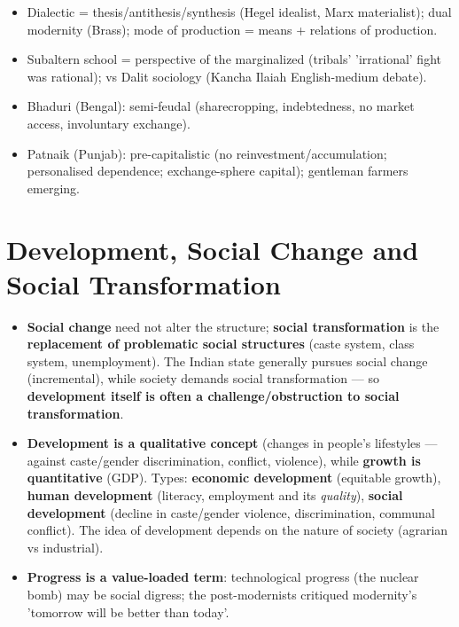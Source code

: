 \begin{QuickRevision}
\begin{itemize}
\item Dialectic = thesis/antithesis/synthesis (Hegel idealist, Marx materialist); dual modernity (Brass); mode of production = means + relations of production.
\item Subaltern school = perspective of the marginalized (tribals' 'irrational' fight was rational); vs Dalit sociology (Kancha Ilaiah English-medium debate).
\item Bhaduri (Bengal): semi-feudal (sharecropping, indebtedness, no market access, involuntary exchange).
\item Patnaik (Punjab): pre-capitalistic (no reinvestment/accumulation; personalised dependence; exchange-sphere capital); gentleman farmers emerging.
\end{itemize}
\end{QuickRevision}

\section{Development, Social Change and Social Transformation}

\begin{KeyConcept}
\begin{itemize}
\item \textbf{Social change} need not alter the structure; \textbf{social transformation} is the \textbf{replacement of problematic social structures} (caste system, class system, unemployment). The Indian state generally pursues social change (incremental), while society demands social transformation --- so \textbf{development itself is often a challenge/obstruction to social transformation}.
\item \textbf{Development is a qualitative concept} (changes in people's lifestyles --- against caste/gender discrimination, conflict, violence), while \textbf{growth is quantitative} (GDP). Types: \textbf{economic development} (equitable growth), \textbf{human development} (literacy, employment and its \emph{quality}), \textbf{social development} (decline in caste/gender violence, discrimination, communal conflict). The idea of development depends on the nature of society (agrarian vs industrial).
\item \textbf{Progress is a value-loaded term}: technological progress (the nuclear bomb) may be social digress; the post-modernists critiqued modernity's 'tomorrow will be better than today'.
\end{itemize}
\end{KeyConcept}

